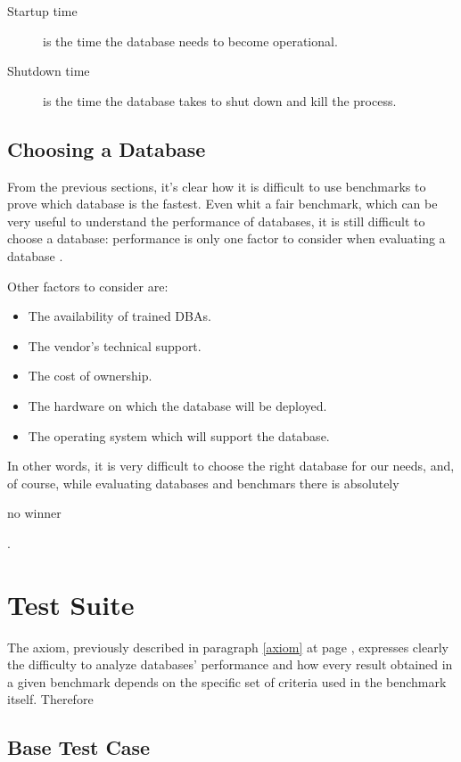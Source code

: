 \begin{description}
	\item[Startup time] is the time the database needs to become operational. 
	
	\item[Shutdown time] is the time the database takes to shut down and kill the process.
	
\end{description}
	
	\section{Choosing a Database}
From the previous sections, it's clear how it is difficult to use benchmarks to prove which database is the fastest. Even whit a fair benchmark, which can be very useful to understand the performance of databases, it is still difficult to choose a database: performance is only one factor to consider when evaluating a database \cite{burleson}. 

Other factors to consider are:
\begin{itemize}
	\item The availability of trained DBAs.
	\item The vendor's technical support.
	\item The cost of ownership.
	\item The hardware on which the database will be deployed.
	\item The operating system which will support the database.
\end{itemize}

In other words, it is very difficult to choose the right database for our needs, and, of course, while evaluating databases and benchmars there is absolutely \begin{bfseries} no winner \end{bfseries}.


\chapter{Test Suite}	
The axiom, previously described in paragraph \ref{axiom} at page \pageref{axiom}, expresses clearly the difficulty to analyze databases' performance and how every result obtained in a given benchmark depends on the specific set of criteria used in the benchmark itself. Therefore

	\section{Base Test Case}
